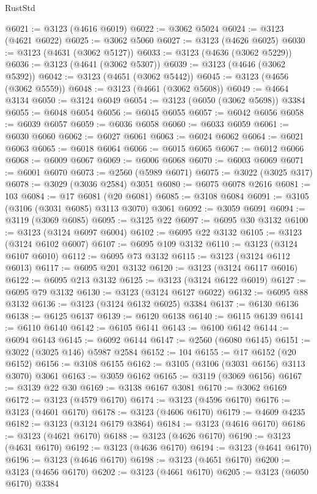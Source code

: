 \begin{lexlean}{RustStd}
\begin{coremodule}
@6021 := @3123 (@4616 @6019)
@6022 := @3062 @5024
@6024 := @3123 (@4621 @6022)
@6025 := @3062 @5060
@6027 := @3123 (@4626 @6025)
@6030 := @3123 (@4631 (@3062 @5127))
@6033 := @3123 (@4636 (@3062 @5229))
@6036 := @3123 (@4641 (@3062 @5307))
@6039 := @3123 (@4646 (@3062 @5392))
@6042 := @3123 (@4651 (@3062 @5442))
@6045 := @3123 (@4656 (@3062 @5559))
@6048 := @3123 (@4661 (@3062 @5608))
@6049 := @4664 @3134
@6050 := @3124 @6049
@6054 := @3123 (@6050 (@3062 @5698)) @3384
@6055 := @6048 @6054
@6056 := @6045 @6055
@6057 := @6042 @6056
@6058 := @6039 @6057
@6059 := @6036 @6058
@6060 := @6033 @6059
@6061 := @6030 @6060
@6062 := @6027 @6061
@6063 := @6024 @6062
@6064 := @6021 @6063
@6065 := @6018 @6064
@6066 := @6015 @6065
@6067 := @6012 @6066
@6068 := @6009 @6067
@6069 := @6006 @6068
@6070 := @6003 @6069
@6071 := @6001 @6070
@6073 := @2560 (@5989 @6071)
@6075 := @3022 (@3025 @317)
@6078 := @3029 (@3036 @2584) @3051
@6080 := @6075 @6078 @2616
@6081 := 103
@6084 := @17 @6081 (@20 @6081)
@6085 := @3108 @6084
@6091 := @3105 (@3106 (@3031 @6085) @3113 @3070) @3061
@6092 := @3059 @6091
@6094 := @3119 (@3069 @6085)
@6095 := @3125 @22
@6097 := @6095 @30 @3132
@6100 := @3123 (@3124 @6097 @6004)
@6102 := @6095 @22 @3132
@6105 := @3123 (@3124 @6102 @6007)
@6107 := @6095 @109 @3132
@6110 := @3123 (@3124 @6107 @6010)
@6112 := @6095 @73 @3132
@6115 := @3123 (@3124 @6112 @6013)
@6117 := @6095 @201 @3132
@6120 := @3123 (@3124 @6117 @6016)
@6122 := @6095 @213 @3132
@6125 := @3123 (@3124 @6122 @6019)
@6127 := @6095 @79 @3132
@6130 := @3123 (@3124 @6127 @6022)
@6132 := @6095 @88 @3132
@6136 := @3123 (@3124 @6132 @6025) @3384
@6137 := @6130 @6136
@6138 := @6125 @6137
@6139 := @6120 @6138
@6140 := @6115 @6139
@6141 := @6110 @6140
@6142 := @6105 @6141
@6143 := @6100 @6142
@6144 := @6094 @6143
@6145 := @6092 @6144
@6147 := @2560 (@6080 @6145)
@6151 := @3022 (@3025 @146) @5987 @2584
@6152 := 104
@6155 := @17 @6152 (@20 @6152)
@6156 := @3108 @6155
@6162 := @3105 (@3106 (@3031 @6156) @3113 @3070) @3061
@6163 := @3059 @6162
@6165 := @3119 (@3069 @6156)
@6167 := @3139 @22 @30
@6169 := @3138 @6167 @3081
@6170 := @3062 @6169
@6172 := @3123 (@4579 @6170)
@6174 := @3123 (@4596 @6170)
@6176 := @3123 (@4601 @6170)
@6178 := @3123 (@4606 @6170)
@6179 := @4609 @4235
@6182 := @3123 (@3124 @6179 @3864)
@6184 := @3123 (@4616 @6170)
@6186 := @3123 (@4621 @6170)
@6188 := @3123 (@4626 @6170)
@6190 := @3123 (@4631 @6170)
@6192 := @3123 (@4636 @6170)
@6194 := @3123 (@4641 @6170)
@6196 := @3123 (@4646 @6170)
@6198 := @3123 (@4651 @6170)
@6200 := @3123 (@4656 @6170)
@6202 := @3123 (@4661 @6170)
@6205 := @3123 (@6050 @6170) @3384

\end{coremodule}
\end{lexlean}
